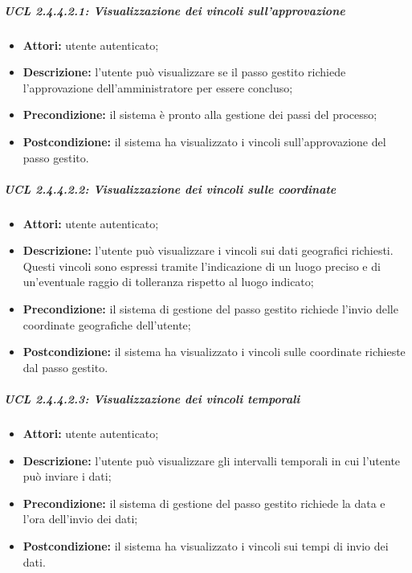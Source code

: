 \subparagraph{UCL 2.4.4.2.1: Visualizzazione dei vincoli sull'approvazione}
\begin{itemize}
\item \textbf{Attori:} utente autenticato;
\item \textbf{Descrizione:} l'utente può visualizzare se il passo gestito richiede l'approvazione dell'amministratore per essere concluso;
\item \textbf{Precondizione:} il sistema è pronto alla gestione dei passi del processo;
\item \textbf{Postcondizione:} il sistema ha visualizzato i vincoli sull'approvazione del passo gestito.
\end{itemize}

\subparagraph{UCL 2.4.4.2.2: Visualizzazione dei vincoli sulle coordinate}
\begin{itemize}
\item \textbf{Attori:} utente autenticato;
\item \textbf{Descrizione:} l'utente può visualizzare i vincoli sui dati geografici richiesti. Questi vincoli sono espressi tramite l'indicazione di un luogo preciso e di un'eventuale raggio di tolleranza rispetto al luogo indicato;
\item \textbf{Precondizione:} il sistema di gestione del passo gestito richiede l'invio delle coordinate geografiche dell'utente;
\item \textbf{Postcondizione:} il sistema ha visualizzato i vincoli sulle coordinate richieste dal passo gestito.
\end{itemize}

\subparagraph{UCL 2.4.4.2.3: Visualizzazione dei vincoli temporali}
\begin{itemize}
\item \textbf{Attori:} utente autenticato;
\item \textbf{Descrizione:} l'utente può visualizzare gli intervalli temporali in cui l'utente può inviare i dati;
\item \textbf{Precondizione:} il sistema di gestione del passo gestito richiede la data e l'ora dell'invio dei dati;
\item \textbf{Postcondizione:} il sistema ha visualizzato i vincoli sui tempi di invio dei dati.
\end{itemize}

